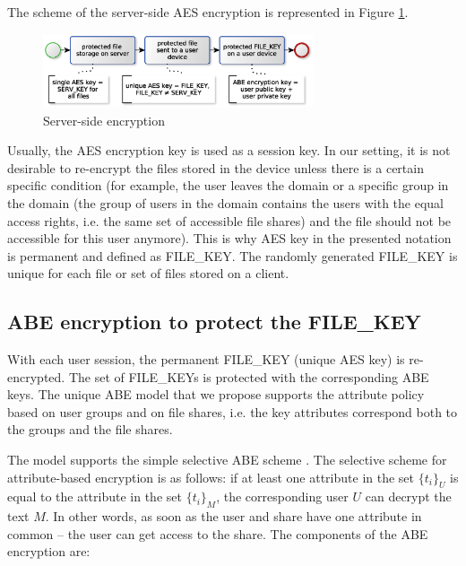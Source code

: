 \documentclass[twocolumn]{svjour3}          	%
\begin{document}
The scheme of the server-side AES encryption is represented in Figure \ref{fig:09}.

\begin{figure}[h!]
	\centering
	\includegraphics[width=8cm]{fig09.eps}
	\caption{Server-side encryption}
	\label{fig:09}
\end{figure}

Usually, the AES encryption key is used as a session key. In our setting, it is not desirable to re-encrypt the files stored in the device unless there is a certain specific condition (for example, the user leaves the domain or a specific group in the domain (the group of users in the domain contains the users with the equal access rights, i.e. the same set of accessible file shares) and the file should not be accessible for this user anymore). This is why AES key in the presented notation is permanent and defined as FILE\_KEY. The randomly generated FILE\_KEY is unique for each file or set of files stored on a client. 

\subsection{ABE encryption to protect the FILE\_KEY }
\label{sec_abe}
With each user session, the permanent FILE\_KEY (uni\-que AES key) is re-encrypted. The set of FILE\_KEYs is protected with the corresponding ABE keys. The unique ABE model that we propose supports the attribute policy based on user groups and on file shares, i.e. the key attributes correspond both to the groups and the file shares. 

The model supports the simple selective ABE scheme \cite{galibus2015cloud,galibus2014}. The selective scheme for attribute-based encryption is as follows: if at least one attribute in the set $\{t_i\}_U$ is equal to the attribute in the set $\{t_i\}_M$, the corresponding user $U$ can decrypt the text $M$. In other words, as soon as the user and share have one attribute in common – the user can get access to the share. The components of the ABE encryption are:
\end{document}
